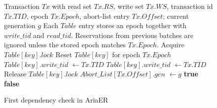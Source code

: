 \documentclass[english,preprint,JIP]{ipsj}
\begin{document}
\begin{figure}[!t]
\begin{algorithm}[H]
    \caption{First dependency check in AriaER}
    \label{alg1}
    \begin{algorithmic}[1]  
    \Require Transaction $Tx$ with read set $Tx.RS$, write set $Tx.WS$, transaction id $Tx.TID$, epoch $Tx.Epoch$, abort-list entry $Tx.Offset$; current generation $g$
    \Statex Each $\textit{Table}$ entry stores an epoch together with $write\_tid$ and $read\_tid$. Reservations from previous batches are ignored unless the stored epoch matches $Tx.Epoch$.
    \State
            \State Acquire $\textit{Table}[key].lock$
                \State Reset $\textit{Table}[key]$ for epoch $Tx.Epoch$
                \State $\textit{Table}[key].write\_tid$ $\gets Tx.TID$
                \State $\textit{Table}[key].write\_tid$ $\gets Tx.TID$
            \EndIf
            \State Release $\textit{Table}[key].lock$
        \EndFor
    \EndFunction
    \State
                \State $Abort\_List[Tx.Offset].gen$ $\gets g$
                \State \Return \textbf{true}
            \EndIf
        \EndFor
        \State \Return \textbf{false}
    \EndFunction
    \end{algorithmic}
\end{algorithm}
\end{figure}
\end{document}
